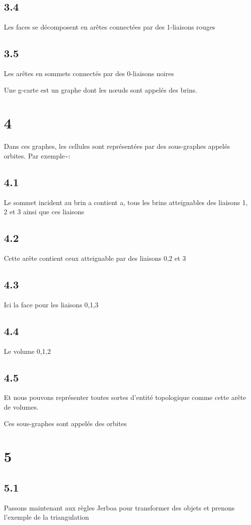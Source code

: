 \documentclass[11pt]{article}
\begin{document}
\subsection{3.4}
\label{sec:org66d67a5}
Les faces se décomposent en arêtes connectées par des 1-liaisons rouges
\subsection{3.5}
\label{sec:orgde3af62}
Les arêtes en sommets connectés par des 0-liaisons noires

Une g-carte est un graphe dont les nœuds sont appelés des brins.
\section{4}
\label{sec:org26ff558}
Dans ces graphes, les cellules sont représentées par des sous-graphes appelés
orbites. Par exemple\textasciitilde{}:
\subsection{4.1}
\label{sec:org213d8a0}
Le sommet incident au brin a contient a, tous les brins atteignables des liaisons 1, 2 et 3 ainsi que ces liaisons
\subsection{4.2}
\label{sec:orgaf5967e}
Cette arête contient ceux atteignable par des liaisons 0,2 et 3
\subsection{4.3}
\label{sec:org46813a8}
Ici la face pour les liaisons 0,1,3
\subsection{4.4}
\label{sec:orgd4a0a09}
Le volume 0,1,2
\subsection{4.5}
\label{sec:org4a90ba3}
Et nous pouvons représenter toutes sortes d'entité topologique comme cette arête de volumes.

Ces sous-graphes sont appelés des orbites
\section{5}
\label{sec:org832ce42}
\subsection{5.1}
\label{sec:org1f35cf8}
Passons maintenant aux règles Jerboa pour transformer des objets et prenons l'exemple de la triangulation
\end{document}
